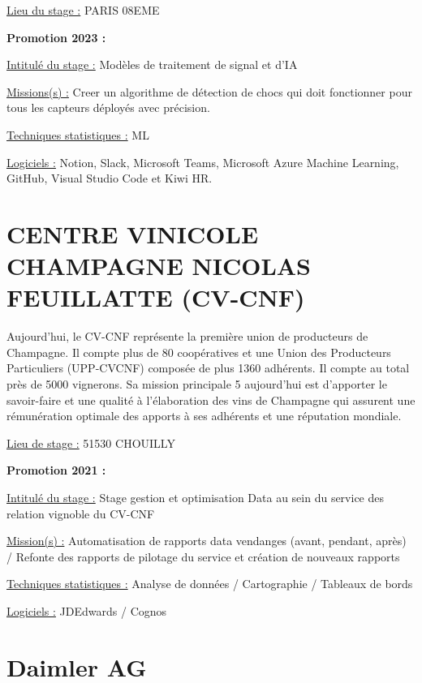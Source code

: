 \documentclass[
  letterpaper,
  DIV=11,
  numbers=noendperiod]{scrreprt}
\begin{document}
\uline{Lieu du stage :} PARIS 08EME

\textbf{Promotion 2023 :}

\uline{Intitulé du stage :} Modèles de traitement de signal et d'IA

\uline{Missions(s) :} Creer un algorithme de détection de chocs qui doit
fonctionner pour tous les capteurs déployés avec précision.

\uline{Techniques statistiques :} ML

\uline{Logiciels :} Notion, Slack, Microsoft Teams, Microsoft Azure
Machine Learning, GitHub, Visual Studio Code et Kiwi HR.

\hypertarget{centre-vinicole-champagne-nicolas-feuillatte-cv-cnf}{%
\section{\texorpdfstring{\textbf{CENTRE VINICOLE CHAMPAGNE NICOLAS
FEUILLATTE
(CV-CNF)}}{CENTRE VINICOLE CHAMPAGNE NICOLAS FEUILLATTE (CV-CNF)}}\label{centre-vinicole-champagne-nicolas-feuillatte-cv-cnf}}

Aujourd'hui, le CV-CNF représente la première union de producteurs de
Champagne. Il compte plus de 80 coopératives et une Union des
Producteurs Particuliers (UPP-CVCNF) composée de plus 1360 adhérents. Il
compte au total près de 5000 vignerons. Sa mission principale 5
aujourd'hui est d'apporter le savoir-faire et une qualité à
l'élaboration des vins de Champagne qui assurent une rémunération
optimale des apports à ses adhérents et une réputation mondiale.

\uline{Lieu de stage :} 51530 CHOUILLY

\textbf{Promotion 2021 :}

\uline{Intitulé du stage :} Stage gestion et optimisation Data au sein
du service des relation vignoble du CV-CNF

\uline{Mission(s) :} Automatisation de rapports data vendanges (avant,
pendant, après) / Refonte des rapports de pilotage du service et
création de nouveaux rapports

\uline{Techniques statistiques :} Analyse de données / Cartographie /
Tableaux de bords

\uline{Logiciels :} JDEdwards / Cognos

\hypertarget{daimler-ag}{%
\section{\texorpdfstring{\textbf{Daimler
AG}}{Daimler AG}}\label{daimler-ag}}
\end{document}
